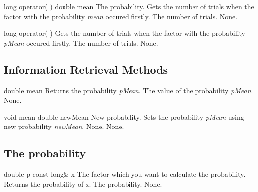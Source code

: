 \setNormalInstance
\printMethodWithOneParam
{long}
{operator( )}
{double}
{mean}
{The probability.}
{Gets the number of trials when the factor with the probability {\em mean}
occured firstly.}
{The number of trials.}
{None.}

\clearpage

\setNormalInstance
\printEmptyMethodReturnSpecial
{long}
{operator( )}
{Gets the number of trials when the factor with the probability {\em pMean}
occured firstly.}
{The number of trials.}
{None.}

\vspace*{10mm}

\subsection{Information Retrieval Methods}

\setConstInstance
\printEmptyMethodReturnSpecial
{double}
{mean}
{Returns the probability {\em pMean}.}
{The value of the probability {\em pMean}.}
{None.}

\setNormalInstance
\printMethodWithOneParam
{void}
{mean}
{double}
{newMean}
{New probability.}
{Sets the probability {\em pMean} using new probability {\em newMean}.}
{None.}
{None.}

\vspace*{10mm}

\subsection{The probability}

\setConstInstance
\printMethodWithOneParam
{double}
{p}
{const long\&}
{x}
{The factor which you want to calculate the probability.}
{Returns the probability of {\em x}.}
{The probability.}
{None.}


